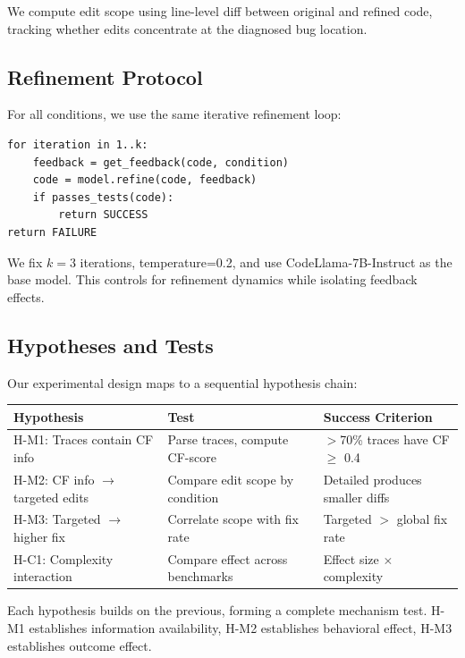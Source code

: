 We compute edit scope using line-level diff between original and refined code, tracking whether edits concentrate at the diagnosed bug location.

\subsection{Refinement Protocol}

For all conditions, we use the same iterative refinement loop:

\begin{verbatim}
for iteration in 1..k:
    feedback = get_feedback(code, condition)
    code = model.refine(code, feedback)
    if passes_tests(code):
        return SUCCESS
return FAILURE
\end{verbatim}

We fix $k=3$ iterations, temperature=0.2, and use CodeLlama-7B-Instruct as the base model. This controls for refinement dynamics while isolating feedback effects.

\subsection{Hypotheses and Tests}

Our experimental design maps to a sequential hypothesis chain:

\begin{table}[h]
\centering
\begin{tabular}{lll}
\toprule
\textbf{Hypothesis} & \textbf{Test} & \textbf{Success Criterion} \\
\midrule
H-M1: Traces contain CF info & Parse traces, compute CF-score & $>$70\% traces have CF $\geq$ 0.4 \\
H-M2: CF info $\rightarrow$ targeted edits & Compare edit scope by condition & Detailed produces smaller diffs \\
H-M3: Targeted $\rightarrow$ higher fix & Correlate scope with fix rate & Targeted $>$ global fix rate \\
H-C1: Complexity interaction & Compare effect across benchmarks & Effect size $\times$ complexity \\
\bottomrule
\end{tabular}
\end{table}

Each hypothesis builds on the previous, forming a complete mechanism test. H-M1 establishes information availability, H-M2 establishes behavioral effect, H-M3 establishes outcome effect.

